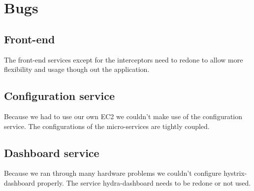 \chapter{Bugs}
\section{Front-end}
The front-end services except for the interceptors need to redone to allow more flexibility and usage though out the application.
\section{Configuration service}
Because we had to use our own EC2 we couldn't make use of the configuration service. The configurations of the micro-services are tightly coupled.

\section{Dashboard service}
Because we ran through many hardware problems we couldn't configure hystrix-dashboard properly. The service hydra-dashboard needs to be redone or not used.